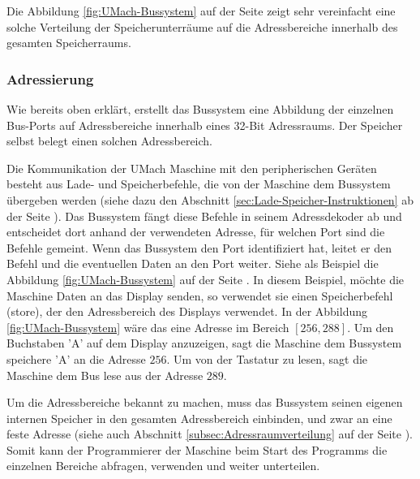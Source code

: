 Die Abbildung
\ref{fig:UMach-Bussystem} auf der Seite \pageref{fig:UMach-Bussystem} zeigt sehr
vereinfacht eine solche Verteilung der Speicherunterräume auf die Adressbereiche
innerhalb des gesamten Speicherraums. 



\subsubsection{Adressierung}

Wie bereits oben erklärt, erstellt das Bussystem eine Abbildung der einzelnen
Bus-Ports auf Adressbereiche innerhalb eines 32-Bit Adressraums. Der Speicher
selbst belegt einen solchen Adressbereich.

Die Kommunikation der UMach Maschine mit den peripherischen Geräten besteht aus
Lade- und Speicherbefehle, die von der Maschine dem Bussystem übergeben werden
(siehe dazu den Abschnitt \ref{sec:Lade-Speicher-Instruktionen} ab der Seite
\pageref{sec:Lade-Speicher-Instruktionen}). Das Bussystem fängt diese Befehle in
seinem \gls{Adressdekoder} ab und entscheidet dort anhand der verwendeten
Adresse, für welchen Port sind die Befehle gemeint. Wenn das Bussystem den Port
identifiziert hat, leitet er den Befehl und die eventuellen Daten an den Port
weiter.
Siehe als Beispiel die Abbildung \ref{fig:UMach-Bussystem} auf der Seite
\pageref{fig:UMach-Bussystem}. In diesem Beispiel, möchte die Maschine Daten an
das Display senden, so verwendet sie einen Speicherbefehl (\glqq store\grqq),
der den Adressbereich des Displays verwendet. In der Abbildung
\ref{fig:UMach-Bussystem} wäre das eine Adresse im Bereich $[256, 288]$. Um den
Buchstaben 'A' auf dem Display anzuzeigen, sagt die Maschine dem Bussystem \glqq
speichere 'A' an die Adresse $256$\grqq. Um von der Tastatur zu lesen, sagt die
Maschine dem Bus \glqq lese aus der Adresse $289$\grqq.


Um die Adressbereiche bekannt zu machen, muss das Bussystem seinen eigenen
internen Speicher in den gesamten Adressbereich einbinden, und zwar an eine
feste Adresse (siehe auch Abschnitt \ref{subsec:Adressraumverteilung} auf der
Seite \pageref{subsec:Adressraumverteilung}).
Somit kann der Programmierer der Maschine beim Start des
Programms die einzelnen Bereiche abfragen, verwenden und weiter unterteilen.


